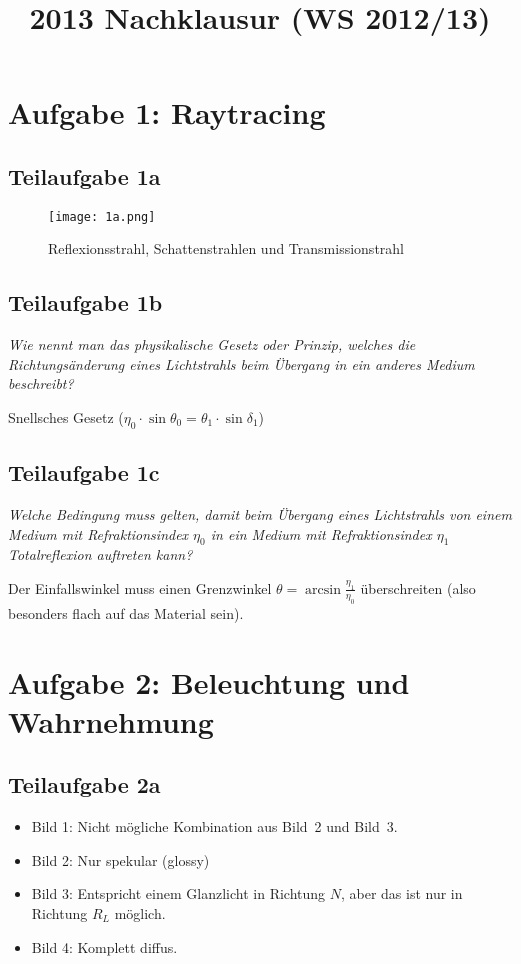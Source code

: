 \documentclass[a4paper]{scrartcl}
\begin{document}
\title{2013 Nachklausur (WS 2012/13)}

\setcounter{section}{1}
\section*{Aufgabe 1: Raytracing}
\subsection*{Teilaufgabe 1a}
\begin{figure}[h]
    \centering
    \texttt{[image: 1a.png]}
    \caption{Reflexionsstrahl, Schattenstrahlen und Transmissionstrahl}
    \label{fig:1a}
\end{figure}

\subsection*{Teilaufgabe 1b}
\textit{Wie nennt man das physikalische Gesetz oder Prinzip, welches die Richtungsänderung
eines Lichtstrahls beim Übergang in ein anderes Medium beschreibt?}

Snellsches Gesetz ($\eta_0 \cdot \sin \theta_0 = \theta_1 \cdot \sin \delta_1$)

\subsection*{Teilaufgabe 1c}
\textit{Welche Bedingung muss gelten, damit beim Übergang eines Lichtstrahls
von einem Medium mit Refraktionsindex $\eta_0$ in ein Medium mit
Refraktionsindex $\eta_1$ Totalreflexion auftreten kann?}

Der Einfallswinkel muss einen Grenzwinkel
$\theta = \arcsin \frac{\eta_1}{\eta_0}$
überschreiten (also besonders flach auf das Material sein).


\section*{Aufgabe 2: Beleuchtung und Wahrnehmung}
\subsection*{Teilaufgabe 2a}
\begin{itemize}
    \item Bild 1: Nicht mögliche Kombination aus Bild~2 und Bild~3.
    \item Bild 2: Nur spekular (glossy)
    \item Bild 3: Entspricht einem Glanzlicht in Richtung $N$, aber das ist nur
                  in Richtung $R_L$ möglich.
    \item Bild 4: Komplett diffus.
\end{itemize}
\end{document}
